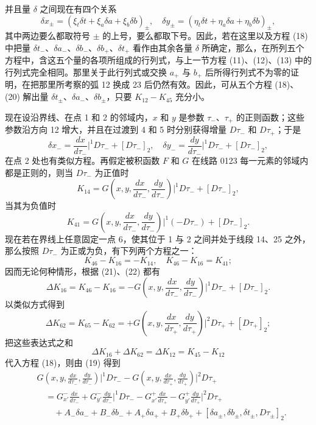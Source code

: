 \documentclass[11pt,a4paper,leqno]{article}
\begin{document}
并且量 $\delta$ 之间现在有四个关系
\begin{equation}\tag{20}
\delta x_\pm=(\xi_t\delta t+\xi_a\delta a+\xi_b\delta b)_\pm,
\quad
\delta y_\pm=(\eta_t\delta t+\eta_a\delta a+\eta_b\delta b)_\pm,
\end{equation}
其中两边要么都取符号 $\pm$ 的上号，要么都取下号。因此，若在这里以及方程 (18) 中把量 $\delta t_-$、$\delta a_-$、$\delta b_-$、$\delta b_+$、$\delta t_+$ 看作由其余各量 $\delta$ 所确定，那么，在所列五个方程中，含这五个量的各项所组成的行列式，与上一节方程 (11)、(12)、(13) 中的行列式完全相同。那里关于此行列式或交换 $a_+$ 与 $b_+$ 后所得行列式不为零的证明，在把那里所考察的弧 12 换成 23 后仍然有效。因此，可从五个方程 (18)、(20) 解出量 $\delta t_\pm$、$\delta a_-$、$\delta b_\pm$，只要 $K_{12}-K_{45}$ 充分小。

现在设沿界线、在点 1 和 2 的邻域内，$x$ 和 $y$ 是参数 $\tau_-$、$\tau_+$ 的正则函数；这些参数沿方向 12 增大，并且在过渡到 4 和 5 时分别获得增量 $D\tau_-$ 和 $D\tau_+$；于是
\[
\delta x_- =\frac{dx}{d\tau_-}\bigg|^1D\tau_-+[D\tau_-]_2,
\quad
\delta y_- =\frac{dy}{d\tau_-}\bigg|^1D\tau_-+[D\tau_-]_2,
\]
在点 2 处也有类似方程。再假定被积函数 $F$ 和 $G$ 在线路 0123 每一元素的邻域内都是正则的，则当 $D\tau_-$ 为正值时
\begin{equation}\tag{21}
K_{14}=G\left(x,y,\frac{dx}{d\tau_-},\frac{dy}{d\tau_-}\right)\bigg|^1D\tau_-+[D\tau_-]_2,
\end{equation}
当其为负值时
\begin{equation}\tag{22}
K_{41}=G\left(x,y,\frac{dx}{d\tau_-},\frac{dy}{d\tau_-}\right)\bigg|^1(-D\tau_-)+[D\tau_-]_2.
\end{equation}
现在若在界线上任意固定一点 6，使其位于 1 与 2 之间并处于线段 14、25 之外，那么按照 $D\tau_-$ 为正或为负，有下列两个方程之一：
\[
K_{46}-K_{16}=-K_{14},
\quad
K_{46}-K_{16}=K_{41};
\]
因而无论何种情形，根据 (21)、(22) 都有
\begin{equation}\tag{23}
\Delta K_{16}=K_{46}-K_{16}
=-G\left(x,y,\frac{dx}{d\tau_-},\frac{dy}{d\tau_-}\right)\bigg|^1D\tau_-+[D\tau_-]_2.
\end{equation}
以类似方式得到
\begin{equation}\tag{24}
\Delta K_{62}=K_{65}-K_{62}
=+G\left(x,y,\frac{dx}{d\tau_+},\frac{dy}{d\tau_+}\right)\bigg|^2D\tau_+ +[D\tau_+]_2;
\end{equation}
把这些表达式之和
\[
\Delta K_{16}+\Delta K_{62}=\Delta K_{12}=K_{45}-K_{12}
\]
代入方程 (18)，则由 (19) 得到
\begin{equation}\tag{25}
\begin{aligned}
&G\left(x,y,\frac{dx}{d\tau_-},\frac{dy}{d\tau_-}\right)\bigg|^1D\tau_-
-G\left(x,y,\frac{dx}{d\tau_+},\frac{dy}{d\tau_+}\right)\bigg|^2D\tau_+\\
&\quad=G_{x'}^-\frac{dx}{d\tau_-}+G_{y'}^-\frac{dy}{d\tau_-}\bigg|^1D\tau_-
-G_{x'}^+\frac{dx}{d\tau_+}-G_{y'}^+\frac{dy}{d\tau_+}\bigg|^2D\tau_+\\
&\qquad +A_-\delta a_-+B_-\delta b_-+A_+\delta a_+ +B_+\delta b_+
+[\delta a_\pm,\delta b_\pm,\delta t_\pm,D\tau_\pm]_2.
\end{aligned}
\end{equation}
\end{document}

